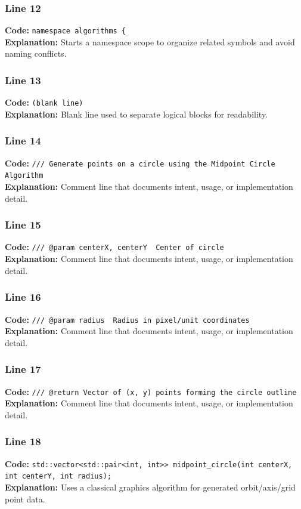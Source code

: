 \documentclass[11pt,a4paper]{article}
\begin{document}
\subsubsection*{Line 12}
\textbf{Code:} \verb|namespace algorithms {|\\
\textbf{Explanation:} Starts a namespace scope to organize related symbols and avoid naming conflicts.

\subsubsection*{Line 13}
\textbf{Code:} \texttt{(blank line)}\\
\textbf{Explanation:} Blank line used to separate logical blocks for readability.

\subsubsection*{Line 14}
\textbf{Code:} \verb|/// Generate points on a circle using the Midpoint Circle Algorithm|\\
\textbf{Explanation:} Comment line that documents intent, usage, or implementation detail.

\subsubsection*{Line 15}
\textbf{Code:} \verb|/// @param centerX, centerY  Center of circle|\\
\textbf{Explanation:} Comment line that documents intent, usage, or implementation detail.

\subsubsection*{Line 16}
\textbf{Code:} \verb|/// @param radius  Radius in pixel/unit coordinates|\\
\textbf{Explanation:} Comment line that documents intent, usage, or implementation detail.

\subsubsection*{Line 17}
\textbf{Code:} \verb|/// @return Vector of (x, y) points forming the circle outline|\\
\textbf{Explanation:} Comment line that documents intent, usage, or implementation detail.

\subsubsection*{Line 18}
\textbf{Code:} \verb|std::vector<std::pair<int, int>> midpoint_circle(int centerX, int centerY, int radius);|\\
\textbf{Explanation:} Uses a classical graphics algorithm for generated orbit/axis/grid point data.
\end{document}
